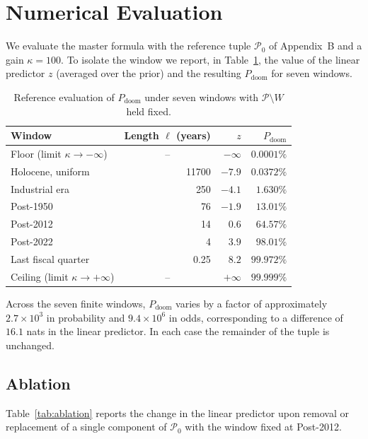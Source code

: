 \documentclass[11pt]{article}
\theoremstyle{remark}
\newcommand{\PD}{P_{\mathrm{doom}}}
\begin{document}
\section{Numerical Evaluation}\label{sec:numerical}

We evaluate the master formula with the reference tuple $\mathcal{P}_0$ of Appendix~B and a gain $\kappa=100$. To isolate the window we report, in Table~\ref{tab:windows}, the value of the linear predictor $z$ (averaged over the prior) and the resulting $\PD$ for seven windows.

\begin{table}[h]
\centering
\caption{Reference evaluation of $\PD$ under seven windows with $\mathcal{P}\setminus W$ held fixed.}\label{tab:windows}
\begin{tabular}{@{}lrrr@{}}
\toprule
Window & Length $\ell$ (years) & $z$ & $\PD$ \\
\midrule
Floor (limit $\kappa\to-\infty$) & \multicolumn{1}{c}{--} & $-\infty$ & $0.0001\%$ \\
Holocene, uniform & 11700 & $-7.9$ & $0.0372\%$ \\
Industrial era & 250 & $-4.1$ & $1.630\%$ \\
Post-1950 & 76 & $-1.9$ & $13.01\%$ \\
Post-2012 & 14 & $0.6$ & $64.57\%$ \\
Post-2022 & 4 & $3.9$ & $98.01\%$ \\
Last fiscal quarter & 0.25 & $8.2$ & $99.972\%$ \\
Ceiling (limit $\kappa\to+\infty$) & \multicolumn{1}{c}{--} & $+\infty$ & $99.999\%$ \\
\bottomrule
\end{tabular}
\end{table}

Across the seven finite windows, $\PD$ varies by a factor of approximately $2.7\times10^{3}$ in probability and $9.4\times10^{6}$ in odds, corresponding to a difference of $16.1$ nats in the linear predictor. In each case the remainder of the tuple is unchanged.

\subsection{Ablation}

Table~\ref{tab:ablation} reports the change in the linear predictor upon removal or replacement of a single component of $\mathcal{P}_0$ with the window fixed at Post-2012.
\end{document}
